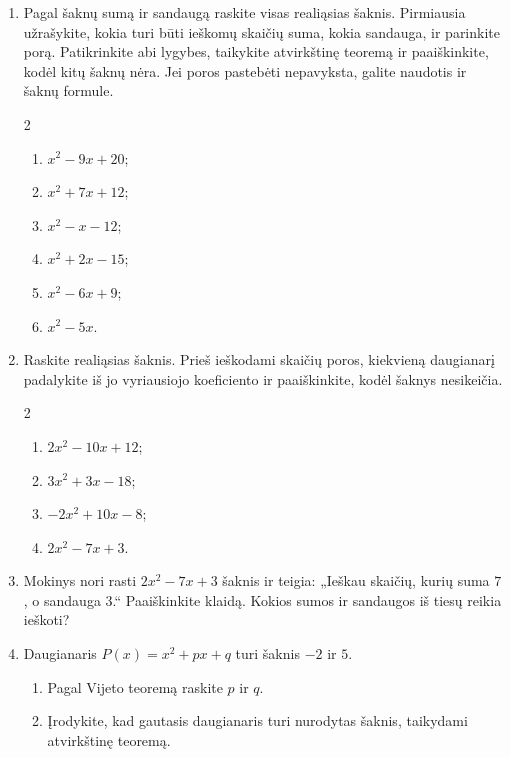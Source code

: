 \documentclass[12pt,a4paper]{article}
\begin{document}
\begin{enumerate}[series=uzdaviniai]
\begin{enumerate}
\item $x^2-5x+6$: $(2;3)$ ar $(1;4)$? \item $x^2+x-6$: $(-3;2)$ ar $(-2;3)$?
\item $2x^2-7x+3$: $(3;\frac{1}{2})$ ar $(3;1)$? \item $x^2-4x+4$: $(2;2)$ ar $(-2;-2)$?
\end{enumerate}
\item Pagal šaknų sumą ir sandaugą raskite visas realiąsias šaknis. Pirmiausia užrašykite, kokia turi būti ieškomų skaičių suma, kokia sandauga, ir parinkite porą. Patikrinkite abi lygybes, taikykite atvirkštinę teoremą ir paaiškinkite, kodėl kitų šaknų nėra. Jei poros pastebėti nepavyksta, galite naudotis ir šaknų formule.
\begin{multicols}{2}\begin{enumerate}
\item $x^2-9x+20$; \item $x^2+7x+12$; \item $x^2-x-12$; \item $x^2+2x-15$; \item $x^2-6x+9$; \item $x^2-5x$.
\end{enumerate}\end{multicols}
\item Raskite realiąsias šaknis. Prieš ieškodami skaičių poros, kiekvieną daugianarį padalykite iš jo vyriausiojo koeficiento ir paaiškinkite, kodėl šaknys nesikeičia.
\begin{multicols}{2}\begin{enumerate}
\item $2x^2-10x+12$; \item $3x^2+3x-18$; \item $-2x^2+10x-8$; \item $2x^2-7x+3$.
\end{enumerate}\end{multicols}
\item Mokinys nori rasti $2x^2-7x+3$ šaknis ir teigia: „Ieškau skaičių, kurių suma $7$, o sandauga $3$.“ Paaiškinkite klaidą. Kokios sumos ir sandaugos iš tiesų reikia ieškoti?
\needspace{4cm}
\item Daugianaris $P(x)=x^2+px+q$ turi šaknis $-2$ ir $5$.
\begin{enumerate}
\item Pagal Vijeto teoremą raskite $p$ ir $q$.
\item Įrodykite, kad gautasis daugianaris turi nurodytas šaknis, taikydami atvirkštinę teoremą.

\end{enumerate}
\end{enumerate}
\end{document}
